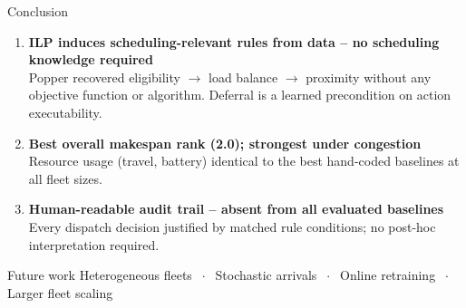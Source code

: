 \documentclass[aspectratio=169]{beamer}
\begin{document}
\begin{frame}[shrink=5]{Conclusion}
  \begin{enumerate}
    \item \textbf{ILP induces scheduling-relevant rules from data -- no scheduling knowledge required}\\
      \small Popper recovered eligibility $\to$ load balance $\to$ proximity without any objective function or algorithm.
      Deferral is a learned precondition on action executability.
    \normalsize
    \vspace{0.3em}
    \item \textbf{Best overall makespan rank (2.0); strongest under congestion}\\
      \small Resource usage (travel, battery) identical to the best hand-coded baselines at all fleet sizes.
    \normalsize
    \vspace{0.3em}
    \item \textbf{Human-readable audit trail -- absent from all evaluated baselines}\\
      \small Every dispatch decision justified by matched rule conditions; no post-hoc interpretation required.
  \end{enumerate}
  \vspace{0.3em}
  \begin{block}{Future work}
    \small Heterogeneous fleets $\;\cdot\;$ Stochastic arrivals $\;\cdot\;$ Online retraining $\;\cdot\;$ Larger fleet scaling
  \end{block}
\end{frame}
\end{document}
